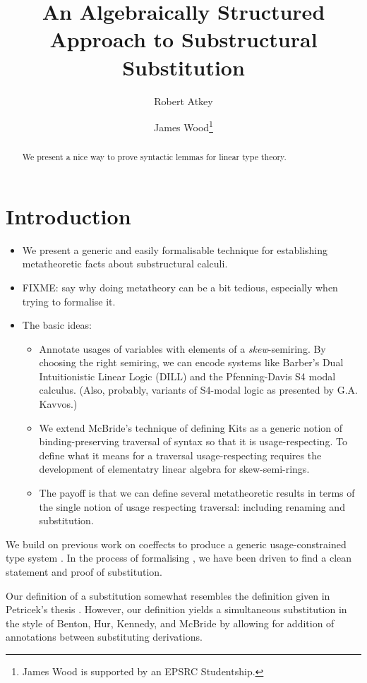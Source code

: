 \documentclass[submission,copyright,creativecommons]{eptcs}
\title{An Algebraically Structured Approach to Substructural Substitution}
\author{Robert Atkey
\institute{University of Strathclyde\\ Glasgow, United Kingdom}
\email{robert.atkey@strath.ac.uk}
\and
James Wood\thanks{James Wood is supported by an EPSRC Studentship.}
\institute{University of Strathclyde\\ Glasgow, United Kingdom}
\email{james.wood.100@strath.ac.uk}
}
\begin{document}
\maketitle

\begin{abstract}
  We present a nice way to prove syntactic lemmas for linear type theory.
\end{abstract}

\section{Introduction}

\begin{itemize}
\item We present a generic and easily formalisable technique for
  establishing metatheoretic facts about substructural calculi.
\item FIXME: say why doing metatheory can be a bit tedious, especially
  when trying to formalise it.
\item The basic ideas:
  \begin{itemize}
  \item Annotate usages of variables with elements of a
    \emph{skew}-semiring. By choosing the right semiring, we can
    encode systems like Barber's Dual Intuitionistic Linear Logic
    (DILL) and the Pfenning-Davis S4 modal calculus. (Also, probably,
    variants of S4-modal logic as presented by G.A. Kavvos.)
  \item We extend McBride's technique of defining Kits as a generic
    notion of binding-preserving traversal of syntax so that it is
    usage-respecting. To define what it means for a traversal
    usage-respecting requires the development of elementatry linear
    algebra for skew-semi-rings.
  \item The payoff is that we can define several metatheoretic results
    in terms of the single notion of usage respecting traversal:
    including renaming and substitution.
  \end{itemize}
\end{itemize}

We build on previous work on coeffects
\cite{BrunelGMZ14,GhicaS14,reed10distance,PetricekOM14} to produce a generic
usage-constrained type system \name{}.
In the process of formalising \name{}, we have been driven to find a clean
statement and proof of substitution.

Our definition of a substitution somewhat resembles the definition given in
Petricek's thesis \cite[p. 137]{petricek-thesis}.
However, our definition yields a simultaneous substitution in the style of
Benton, Hur, Kennedy, and McBride \cite{bhkm12} by allowing for addition of
annotations between substituting derivations.
\end{document}

